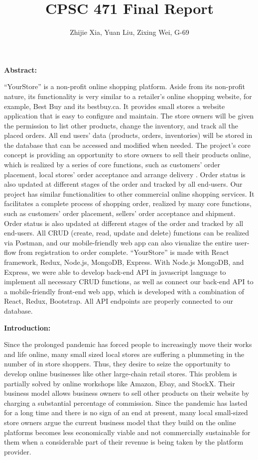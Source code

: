 \documentclass[12pt]{article}
\author{Zhijie Xia, Yuan Liu, Zixing Wei, G-69}
\title{CPSC 471 Final Report}
\begin{document}
\maketitle
\newpage

\textbf{Abstract:}

\vspace*{5mm}
“YourStore” is a non-profit online shopping platform. Aside from its non-profit nature, its functionality is very similar to a retailer’s online shopping website, for example, Best Buy and its bestbuy.ca. It provides small stores a website application that is easy to configure and maintain.
The store owners will be given the permission to list other products, change the inventory, and track all the placed orders. All end users’ data (products, orders, inventories) will be stored in the database that can be accessed and modified when needed. The project’s core concept is providing an opportunity to store owners to sell their
products online, which is realized by a series of core functions, such as customers’ order placement, local stores’ order acceptance and arrange delivery . Order status is also updated at different stages of the order and tracked by all end-users.
Our project has similar functionalities to other commercial online shopping services. It facilitates a complete process of shopping order, realized by many core functions, such as customers’ order placement, sellers’ order acceptance and shipment. Order status is also updated at different stages of the order and tracked by all end-users. All CRUD (create, read, update and delete) functions can be realized via Postman, and our mobile-friendly web app can also visualize the entire user-flow from registration to order complete.
“YourStore” is made with React framework, Redux, Node.js, MongoDB, Express. With Node.js MongoDB, and Express, we were able to develop back-end API in javascript language to implement all necessary CRUD functions, as well as connect our back-end API to a mobile-friendly front-end web app, which is developed with a combination of React, Redux, Bootstrap. All API endpoints are properly connected to our database.


\newpage
\textbf{Introduction:}
\vspace*{5mm}

Since the prolonged pandemic has forced people to increasingly move their works and life online, many small sized
local stores are suffering a plummeting in the number of in store shoppers. Thus, they desire to seize the opportunity to develop online businesses like other large-chain retail stores. This problem is partially solved by online workshops like Amazon, Ebay, and StockX.
Their business model allows business owners to sell other products on their website by charging a substantial percentage of commission. Since the pandemic has lasted for a long time and there is no sign of an end at present, many local small-sized store owners argue the current business model that they build on the online platforms becomes less economically viable and not commercially sustainable for them when a considerable part of their revenue is being taken by the platform provider.
\end{document}
